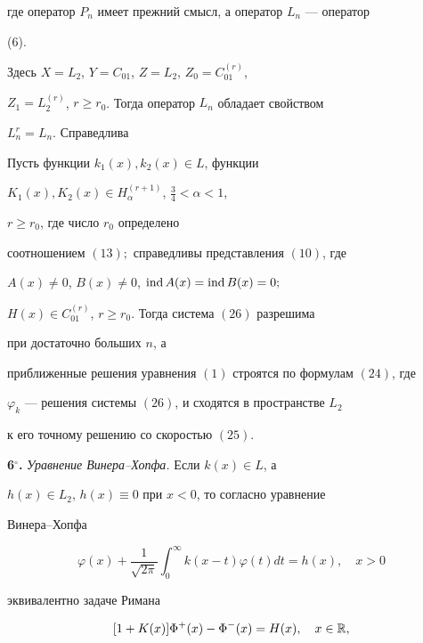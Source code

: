 где оператор $P_n$ имеет прежний смысл, а оператор $L_n$ --- оператор 


(6). 


Здесь $X=L_2$, $Y=C_{01}$, $Z=L_2$, $Z_0=C^{(r)}_{01}$, 


$Z_1=L^{(r)}_2$, $r\ge r_0$. Тогда оператор $L_n$ обладает свойством 


$L^r_n=L_n$. Справедлива 


 


\begin{thm} 


Пусть функции $k_1(x),k_2(x)\in L$, функции 


$K_1(x),K_2(x)\in H^{(r+1)}_\alpha$, $\frac{3}{4}<\alpha< 1$, 


$r\ge r_0$, где число $r_0$ определено 


соотношением $(13);$ справедливы представления $(10)$, где 


$A(x)\ne 0$, $B(x)\ne 0$, $\operatorname{ind} A(x)=\operatorname{ind} B(x)=0;$ 


$H(x)\in C^{(r)}_{01}$, $r\ge r_0$. Тогда система $(26)$ разрешима 


при достаточно больших $n$, а 


приближенные решения уравнения $(1)$ строятся по формулам $(24)$, где 


$\varphi_k$ --- решения системы $(26)$, и сходятся в пространстве $L_2$ 


к его точному решению со скоростью $(25)$. 


\end{thm} 


 


{\bf 6${}^\circ$.} {\it Уравнение Винера--Хопфа.} Если $k(x)\in L$, а 


$h(x)\in L_2$, $h(x)\equiv 0$ при $x<0$, то согласно \cite{6} уравнение 


Винера--Хопфа 


\begin{equation} 


\varphi(x)+\frac{1}{\sqrt{2\pi}}\int^\infty_0 


k(x-t)\varphi(t)dt=h(x),\quad x>0 


\end{equation} 


эквивалентно задаче Римана 


\begin{equation} 


[1+K(x)]\Phi^+(x)-\Phi^-(x)=H(x),\quad x\in \Bbb R, 


\end{equation} 


